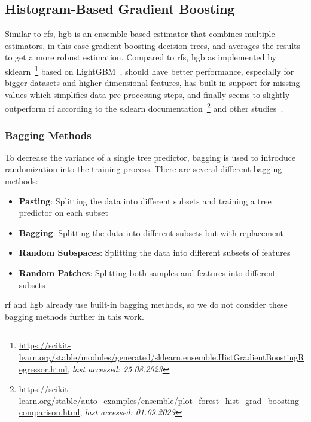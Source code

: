 \subsection{Histogram-Based Gradient Boosting}

Similar to \gls{rf}s, \gls{hgb} is an ensemble-based estimator that combines multiple estimators, in this case gradient boosting decision trees, and averages the results to get a more robust estimation. Compared to \gls{rf}s, \gls{hgb} as implemented by sklearn~\footnote{\url{https://scikit-learn.org/stable/modules/generated/sklearn.ensemble.HistGradientBoostingRegressor.html}, \textit{last accessed: 25.08.2023}} based on LightGBM~\cite{ke2017lightgbm}, should have better performance, especially for bigger datasets and higher dimensional features, has built-in support for missing values which simplifies data pre-processing steps, and finally seems to slightly outperform \gls{rf} according to the sklearn documentation~\footnote{\url{https://scikit-learn.org/stable/auto\_examples/ensemble/plot\_forest\_hist\_grad\_boosting\_comparison.html}, \textit{last accessed: 01.09.2023}} and other studies~\cite{apaydin2022evaluation}.

\subsubsection{Bagging Methods}

To decrease the variance of a single tree predictor, bagging is used to introduce randomization into the training process. There are several different bagging methods:

\begin{itemize}
    \item \textbf{Pasting}: Splitting the data into different subsets and training a tree predictor on each subset~\cite{breiman1999pasting}
    \item \textbf{Bagging}: Splitting the data into different subsets but with replacement~\cite{breiman1996bagging}
    \item \textbf{Random Subspaces}: Splitting the data into different subsets of features~\cite{ho1998random}
    \item \textbf{Random Patches}: Splitting both samples and features into different subsets~\cite{louppe2012ensembles}
\end{itemize}

\gls{rf} and \gls{hgb} already use built-in bagging methods, so we do not consider these bagging methods further in this work.

